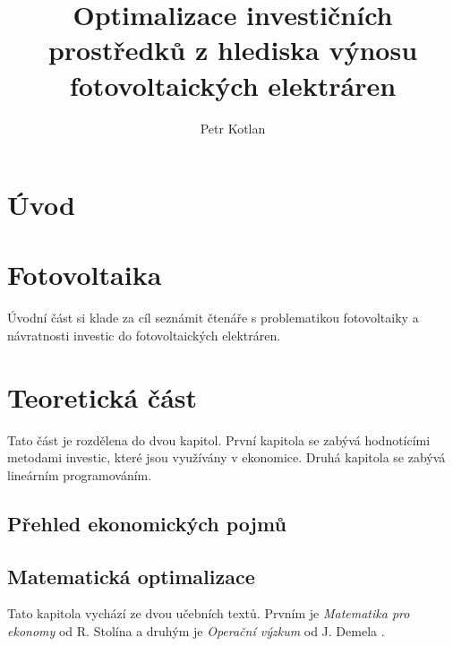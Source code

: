 \documentclass[a4paper, 12pt]{report}
\author{Petr Kotlan}
\title{Optimalizace investičních prostředků z hlediska výnosu fotovoltaických elektráren}
\date{}
\begin{document}





\tableofcontents

\renewcommand{\chaptername}{Úvod}
\chapter*{Úvod}

\chapter{Fotovoltaika}

Úvodní část si klade za cíl seznámit čtenáře s problematikou fotovoltaiky a návratnosti investic do fotovoltaických elektráren.



\renewcommand{\chaptername}{Teoretická část}
\chapter{Teoretická část}

Tato část je rozdělena do dvou kapitol. První kapitola se zabývá hodnotícími metodami investic, které jsou využívány v ekonomice.
Druhá kapitola se zabývá lineárním programováním.

\section{Přehled ekonomických pojmů}


\section{Matematická optimalizace}
Tato kapitola vychází ze dvou učebních textů. Prvním je \textit{Matematika pro ekonomy} od R. Stolína \cite{matematika_pro_ekonomy} a druhým je \textit{Operační výzkum} od J. Demela \cite{demel}.
\end{document}
